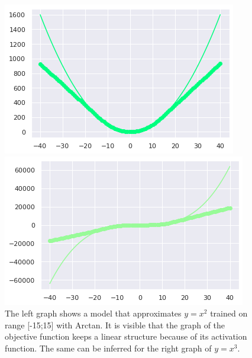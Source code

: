 \documentclass{article}
\begin{document}
\begin{figure}[H]
\begin{multicols}{2}
    \includegraphics[width=\linewidth]{arctan2.png}\par
    \includegraphics[width=\linewidth]{arctan3.png}\par
\end{multicols}
\caption{The left graph shows a model that approximates $y = x^2$ trained on range [-15;15] with Arctan. It is visible that the graph of the objective function keeps a linear structure because of its activation function. The same can be inferred for the right graph of $y=x^3$.}
\end{figure}
\end{document}
